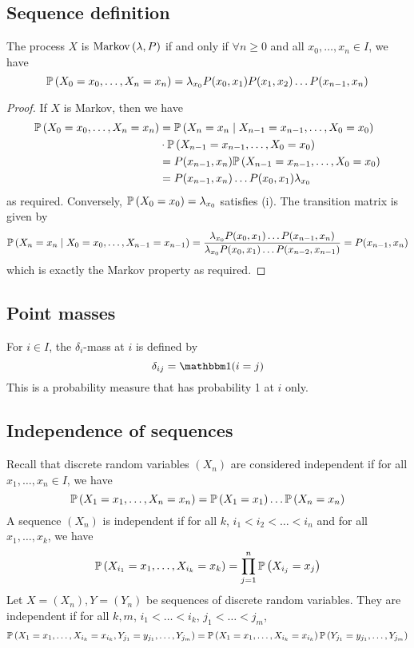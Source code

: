 \subsection{Sequence definition}
\begin{theorem}
	The process \( X \) is \( \operatorname{Markov}\left({\lambda, P}\right) \) if and only if \( \forall n \geq 0 \) and all \( x_0, \dots, x_n \in I \), we have
	\[
		\mathbb{P}\left({X_0 = x_0, \dots, X_n = x_n}\right) = \lambda_{x_0} P(x_0, x_1) P(x_1, x_2) \dots P(x_{n-1}, x_n)
	\]
\end{theorem}
\begin{proof}
	If \( X \) is Markov, then we have
	\begin{align*}
		\mathbb{P}\left({X_0 = x_0, \dots, X_n = x_n}\right) & = \mathbb{P}\left({X_n = x_n \mid X_{n-1} = x_{n-1}, \dots, X_0 = x_0}\right)  \\
		                                   & \cdot \mathbb{P}\left({X_{n-1} = x_{n-1}, \dots, X_0 = x_0}\right)             \\
		                                   & = P(x_{n-1}, x_n) \mathbb{P}\left({X_{n-1} = x_{n-1}, \dots, X_0 = x_0}\right) \\
		                                   & = P(x_{n-1}, x_n) \dots P(x_0, x_1) \lambda_{x_0}
	\end{align*}
	as required.
	Conversely, \( \mathbb{P}\left({X_0 = x_0}\right) = \lambda_{x_0} \) satisfies (i).
	The transition matrix is given by
	\[
		\mathbb{P}\left({X_n = x_n \mid X_0 = x_0, \dots, X_{n-1} = x_{n-1}}\right) = \frac{\lambda_{x_0} P(x_0, x_1) \dots P(x_{n-1}, x_n)}{\lambda_{x_0} P(x_0, x_1) \dots P(x_{n-2}, x_{n-1})} = P(x_{n-1}, x_n)
	\]
	which is exactly the Markov property as required.
\end{proof}

\subsection{Point masses}
\begin{definition}
	For \( i \in I \), the \( \delta_i \)-mass at \( i \) is defined by
	\[
		\delta_{ij} = \mathbbm 1 (i = j)
	\]
	This is a probability measure that has probability 1 at \( i \) only.
\end{definition}

\subsection{Independence of sequences}
Recall that discrete random variables \( (X_n) \) are considered independent if for all \( x_1, \dots, x_n \in I \), we have
\[
	\mathbb{P}\left({X_1 = x_1, \dots, X_n = x_n}\right) = \mathbb{P}\left({X_1 = x_1}\right)\dots\mathbb{P}\left({X_n = x_n}\right)
\]
A sequence \( (X_n) \) is independent if for all \( k \), \( i_1 < i_2 < \dots < i_n \) and for all \( x_1, \dots, x_k \), we have
\[
	\mathbb{P}\left({X_{i_1} = x_1, \dots, X_{i_k} = x_k}\right) = \prod_{j=1}^n \mathbb{P}\left({X_{i_j} = x_j}\right)
\]
Let \( X = (X_n), Y = (Y_n) \) be sequences of discrete random variables.
They are independent if for all \(k,m\), \( i_1 < \dots < i_k \), \( j_1 < \dots < j_m \),
\[
	\mathbb{P}\left({X_1 = x_1, \dots, X_{i_k} = x_{i_k}, Y_{j_1} = y_{j_1}, \dots, Y_{j_m}}\right) = \mathbb{P}\left({X_1 = x_1, \dots, X_{i_k} = x_{i_k}}\right) \mathbb{P}\left({Y_{j_1} = y_{j_1}, \dots, Y_{j_m}}\right)
\]

